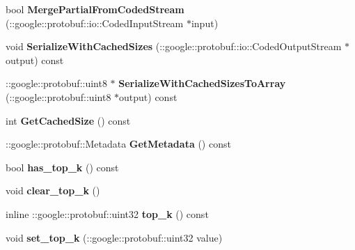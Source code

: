 \begin{DoxyCompactItemize}
bool {\bfseries Merge\+Partial\+From\+Coded\+Stream} (\+::google\+::protobuf\+::io\+::\+Coded\+Input\+Stream $\ast$input)
\item 
\mbox{\label{classcaffe_1_1_accuracy_parameter_a25be52c598347ec246c7047a0b3c269b}} 
void {\bfseries Serialize\+With\+Cached\+Sizes} (\+::google\+::protobuf\+::io\+::\+Coded\+Output\+Stream $\ast$output) const
\item 
\mbox{\label{classcaffe_1_1_accuracy_parameter_a49d1a7b5e3eaea4588abeb0872711498}} 
\+::google\+::protobuf\+::uint8 $\ast$ {\bfseries Serialize\+With\+Cached\+Sizes\+To\+Array} (\+::google\+::protobuf\+::uint8 $\ast$output) const
\item 
\mbox{\label{classcaffe_1_1_accuracy_parameter_ae0b9fea0e9aa03d519bb1654ad54c1c1}} 
int {\bfseries Get\+Cached\+Size} () const
\item 
\mbox{\label{classcaffe_1_1_accuracy_parameter_a5a02d19e03ed3b8cdc9623da8376e13d}} 
\+::google\+::protobuf\+::\+Metadata {\bfseries Get\+Metadata} () const
\item 
\mbox{\label{classcaffe_1_1_accuracy_parameter_a034b1d69865519417b9fa6534a264dfa}} 
bool {\bfseries has\+\_\+top\+\_\+k} () const
\item 
\mbox{\label{classcaffe_1_1_accuracy_parameter_a659dc57a34f9b26e599cf041833ec4d1}} 
void {\bfseries clear\+\_\+top\+\_\+k} ()
\item 
\mbox{\label{classcaffe_1_1_accuracy_parameter_a63e246a3ddf6f4ec24868334e92fff8d}} 
inline \+::google\+::protobuf\+::uint32 {\bfseries top\+\_\+k} () const
\item 
\mbox{\label{classcaffe_1_1_accuracy_parameter_a25149405c0d5fee19a1404afaa47654e}} 
void {\bfseries set\+\_\+top\+\_\+k} (\+::google\+::protobuf\+::uint32 value)
\item 
\mbox{\label{classcaffe_1_1_accuracy_parameter_a84e5b49612aabae7690be7c0247569f6}} 

\end{DoxyCompactItemize}
